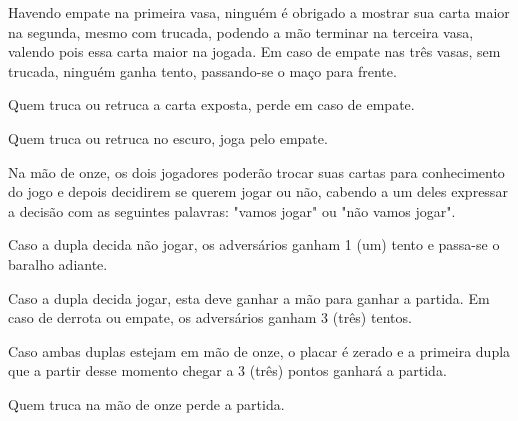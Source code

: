 \begin{article}
	Havendo empate na primeira vasa, ninguém é obrigado a mostrar sua carta maior na segunda, mesmo com trucada, podendo a mão terminar na terceira vasa, valendo pois essa carta maior na jogada. Em caso de empate nas três vasas, sem trucada, ninguém ganha tento, passando-se o maço para frente.

	\begin{xparagraph}
		Quem truca ou retruca a carta exposta, perde em caso de empate.
	\end{xparagraph}

	\begin{xparagraph}
		Quem truca ou retruca no escuro, joga pelo empate.
	\end{xparagraph}
\end{article}

\begin{article}
	Na mão de onze, os dois jogadores poderão trocar suas cartas para conhecimento do jogo e depois decidirem se querem jogar ou não, cabendo a um deles expressar a decisão com as seguintes palavras: "vamos jogar" ou "não vamos jogar".

	\begin{xparagraph}
		Caso a dupla decida não jogar, os adversários ganham 1 (um) tento e passa-se o baralho adiante.
	\end{xparagraph}

	\begin{xparagraph}
		Caso a dupla decida jogar, esta deve ganhar a mão para ganhar a partida. Em caso de derrota ou empate, os adversários ganham 3 (três) tentos.
	\end{xparagraph}

	\begin{xparagraph}
		Caso ambas duplas estejam em mão de onze, o placar é zerado e a primeira dupla que a partir desse momento chegar a 3 (três) pontos ganhará a partida.
	\end{xparagraph}

	\begin{xparagraph}
		Quem truca na mão de onze perde a partida.
	\end{xparagraph}
\end{article}
